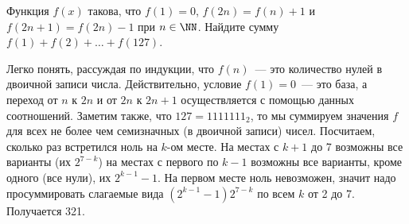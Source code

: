Функция $f(x)$ такова, что
$f(1) = 0$, $f(2 n) = f(n) + 1$ и $f(2 n + 1) = f(2 n) - 1$ при $n \in \NN$.
Найдите сумму $f(1) + f(2) + \ldots + f(127)$.

\solution
Легко понять, рассуждая по индукции, что $f(n)$~--- это количество нулей в
двоичной записи числа.
Действительно, условие $f(1) = 0$~--- это база, а переход от $n$ к $2 n$ и
от $2 n$ к $2 n + 1$ осуществляется с помощью данных соотношений.
Заметим также, что $127 = 1111111_2$, то мы суммируем значения $f$ для всех
не более чем семизначных (в двоичной записи) чисел.
Посчитаем, сколько раз встретился ноль на $k$-ом месте.
На местах с $k + 1$ до 7 возможны все варианты (их $2^{7 - k}$) на местах с
первого по $k - 1$ возможны все варианты, кроме одного (все нули), их
$2^{k - 1} - 1$.
На первом месте ноль невозможен, значит надо просуммировать слагаемые вида
$(2^{k - 1} - 1) 2^{7 - k}$ по всем $k$ от 2 до 7.
Получается 321.

